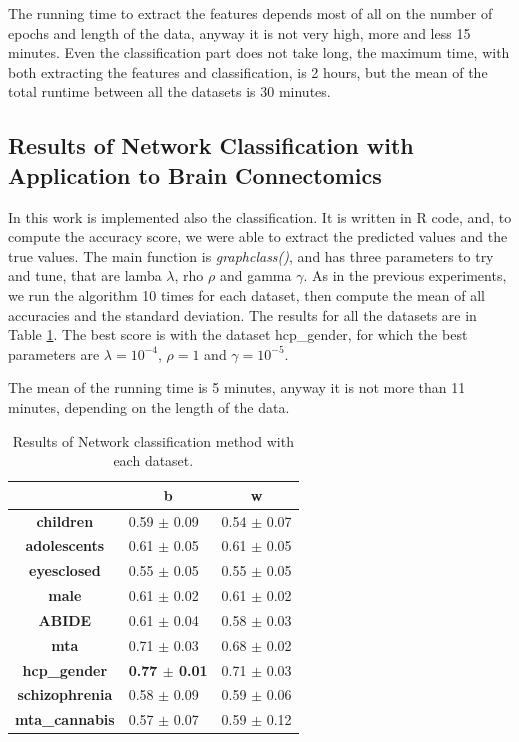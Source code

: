 The running time to extract the features depends most of all on the number of epochs and length of the data, anyway it is not very high, more and less 15 minutes. Even the classification part does not take long, the maximum time, with both extracting the features and classification, is 2 hours, but the mean of the total runtime between all the datasets is 30 minutes.

\subsection{Results of Network Classification with Application to Brain Connectomics}

In this work is implemented also the classification. It is written in R code, and, to compute the accuracy score, we were able to extract the predicted values and the true values. The main function is \textit{graphclass()}, and has three parameters to try and tune, that are lamba $\lambda$, rho $\rho$ and gamma $\gamma$. As in the previous experiments, we run the algorithm 10 times for each dataset, then compute the mean of all accuracies and the standard deviation. The results for all the datasets are in Table \ref{tab:graphclass}. The best score is with the dataset hcp\_gender, for which the best parameters are $\lambda = 10^{-4} $, $\rho = 1$ and $\gamma = 10^{-5}$. 
\vspace{0.5cm}

The mean of the running time is 5 minutes, anyway it is not more than 11 minutes, depending on the length of the data. 

\begin{table}
	\centering
	\begin{tabular}{c|l|c} 
		\toprule
		& \multicolumn{1}{c|}{b} & w                \\ 
		\midrule
		\textbf{children}      & 0.59 $\pm$ 0.09        & 0.54 $\pm$ 0.07  \\
		\textbf{adolescents}   & 0.61 $\pm$ 0.05        & 0.61 $\pm$ 0.05  \\
		\textbf{eyesclosed}    & 0.55 $\pm$ 0.05        & 0.55 $\pm$ 0.05  \\
		\textbf{male}          & 0.61 $\pm$ 0.02        & 0.61 $\pm$ 0.02  \\
		\textbf{ABIDE}         & 0.61 $\pm$ 0.04        & 0.58 $\pm$ 0.03  \\
		\textbf{mta}           & 0.71 $\pm$ 0.03        & 0.68 $\pm$ 0.02  \\
		\textbf{hcp\_gender}   & \textbf{0.77 $\pm$ 0.01}        & 0.71 $\pm$ 0.03  \\
		\textbf{schizophrenia} & 0.58 $\pm$ 0.09        & 0.59 $\pm$ 0.06  \\
		\textbf{mta\_cannabis} & 0.57 $\pm$ 0.07        & 0.59 $\pm$ 0.12 
	\end{tabular}
\caption{Results of Network classification method with each dataset.}
\label{tab:graphclass}
\end{table}

